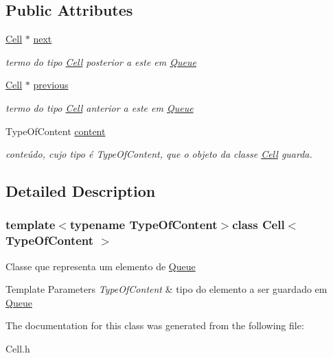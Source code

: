 \subsection*{Public Attributes}
\begin{DoxyCompactItemize}
\item 
\hypertarget{classCell_a9f0d28bc50bc81f27390a6d5932dc457}{\hyperlink{classCell}{Cell} $\ast$ \hyperlink{classCell_a9f0d28bc50bc81f27390a6d5932dc457}{next}}\label{classCell_a9f0d28bc50bc81f27390a6d5932dc457}

\begin{DoxyCompactList}\small\item\em termo do tipo \hyperlink{classCell}{Cell} posterior a este em \hyperlink{classQueue}{Queue} \end{DoxyCompactList}\item 
\hypertarget{classCell_a918f177d29985b59d137cd1aba4e5dcf}{\hyperlink{classCell}{Cell} $\ast$ \hyperlink{classCell_a918f177d29985b59d137cd1aba4e5dcf}{previous}}\label{classCell_a918f177d29985b59d137cd1aba4e5dcf}

\begin{DoxyCompactList}\small\item\em termo do tipo \hyperlink{classCell}{Cell} anterior a este em \hyperlink{classQueue}{Queue} \end{DoxyCompactList}\item 
\hypertarget{classCell_ac969bc8a56a1ddc470f0d398b4017a12}{Type\+Of\+Content \hyperlink{classCell_ac969bc8a56a1ddc470f0d398b4017a12}{content}}\label{classCell_ac969bc8a56a1ddc470f0d398b4017a12}

\begin{DoxyCompactList}\small\item\em conteúdo, cujo tipo é Type\+Of\+Content, que o objeto da classe \hyperlink{classCell}{Cell} guarda. \end{DoxyCompactList}\end{DoxyCompactItemize}


\subsection{Detailed Description}
\subsubsection*{template$<$typename Type\+Of\+Content$>$class Cell$<$ Type\+Of\+Content $>$}

Classe que representa um elemento de \hyperlink{classQueue}{Queue} 
\begin{DoxyTemplParams}{Template Parameters}
{\em Type\+Of\+Content} & tipo do elemento a ser guardado em \hyperlink{classQueue}{Queue} \\
\hline
\end{DoxyTemplParams}


The documentation for this class was generated from the following file\+:\begin{DoxyCompactItemize}
\item 
Cell.\+h\end{DoxyCompactItemize}
